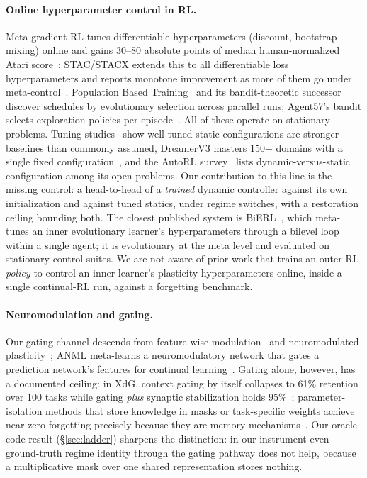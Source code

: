 \documentclass[11pt]{article}
\begin{document}
\paragraph{Online hyperparameter control in RL.}
Meta-gradient RL tunes differentiable hyperparameters (discount, bootstrap
mixing) online and gains 30--80 absolute points of median human-normalized
Atari score~\citep{xu2018metagradient}; STAC/STACX extends this to all
differentiable loss hyperparameters and reports monotone improvement as more
of them go under meta-control~\citep{zahavy2020stac}. Population Based
Training~\citep{jaderberg2017pbt} and its bandit-theoretic
successor~\citep{parkerholder2020pb2} discover schedules by evolutionary
selection across parallel runs; Agent57's bandit selects exploration policies
per episode~\citep{badia2020agent57}. All of these operate on stationary
problems. Tuning studies~\citep{eimer2023hyperparameters,andrychowicz2021whatmatters}
show well-tuned static configurations are stronger baselines than commonly
assumed, DreamerV3 masters 150+ domains with a single fixed
configuration~\citep{hafner2025dreamerv3}, and the AutoRL
survey~\citep{parkerholder2022autorl} lists dynamic-versus-static
configuration among its open problems. Our contribution to this line is the
missing control: a head-to-head of a \emph{trained} dynamic controller against
its own initialization and against tuned statics, under regime switches, with
a restoration ceiling bounding both. The closest published system is
BiERL~\citep{wang2023bierl}, which meta-tunes an inner evolutionary learner's
hyperparameters through a bilevel loop within a single agent; it is
evolutionary at the meta level and evaluated on stationary control suites. We
are not aware of prior work that trains an outer RL \emph{policy} to control
an inner learner's plasticity hyperparameters online, inside a single
continual-RL run, against a forgetting benchmark.

\paragraph{Neuromodulation and gating.}
Our gating channel descends from feature-wise
modulation~\citep{perez2018film,devries2017cbn,dumoulin2018featurewise} and
neuromodulated plasticity~\citep{miconi2018diffplast,miconi2019backpropamine};
ANML meta-learns a neuromodulatory network that gates a prediction network's
features for continual learning~\citep{beaulieu2020anml}. Gating alone,
however, has a documented ceiling: in XdG, context gating by itself collapses
to 61\% retention over 100 tasks while gating \emph{plus} synaptic
stabilization holds 95\%~\citep{masse2018xdg}; parameter-isolation methods
that store knowledge in masks or task-specific weights achieve near-zero
forgetting precisely because they are memory
mechanisms~\citep{wortsman2020supsup,serra2018hat,mallya2018packnet,vonoswald2020hypernetworks}.
Our oracle-code result (\S\ref{sec:ladder}) sharpens the distinction: in our
instrument even ground-truth regime identity through the gating pathway does
not help, because a multiplicative mask over one shared representation stores
nothing.
\end{document}
